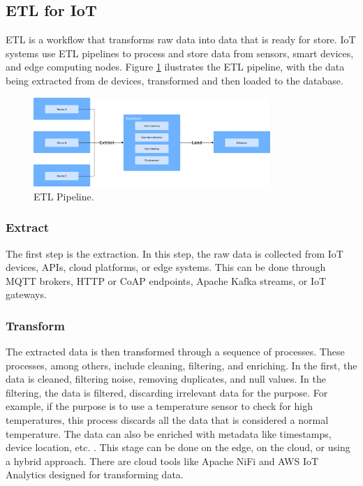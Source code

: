 \subsection{ETL for IoT}
\gls{ETL} is a workflow that transforms raw data into data that is ready for
store. \gls{IoT} systems use \gls{ETL} pipelines to process and store data from sensors,
smart devices, and edge computing nodes. Figure \ref{fig:etl:pipeline}
ilustrates the \gls{ETL} pipeline, with the data being extracted from de devices,
transformed and then loaded to the database\cite{singu2022etl}.

\begin{figure}[htbp]
	\centering
	\includegraphics[width=0.8\textwidth, height=0.5\textheight, keepaspectratio]{Chapters/Figures/ETL/ETL.pdf}
	\caption{\gls{ETL} Pipeline.}
	\label{fig:etl:pipeline}
\end{figure}

\subsubsection{Extract}
The first step is the extraction. In this step, the raw data is collected from
\gls{IoT} devices, \gls{API}s, cloud platforms, or edge systems. This can be done through
\gls{MQTT} brokers, \gls{HTTP} or \gls{CoAP} endpoints, Apache Kafka streams, or \gls{IoT} gateways.

\subsubsection{Transform}
The extracted data is then transformed through a sequence of processes. These
processes, among others, include cleaning, filtering, and enriching.
In the first, the data is cleaned, filtering noise, removing duplicates, and
null values. In the filtering, the data is filtered, discarding irrelevant data
for the purpose. For example, if the purpose is to use a temperature sensor to
check for high temperatures, this process discards all the data that is
considered a normal temperature. The data can also be enriched with metadata
like timestamps, device location, etc. \cite{singu2022etl}. This stage can be done on the edge, on
the cloud, or using a hybrid approach. There are cloud tools like Apache NiFi
and \gls{AWS} \gls{IoT} Analytics designed for transforming data.

